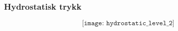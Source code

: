 \documentclass[aspectratio=169,xcolor=dvipsnames]{beamer}
\begin{document}
%
%
%
\begin{frame}
	\frametitle{Hydrostatisk trykk}

$$\texttt{[image: hydrostatic\_level\_2]}$$
\end{frame}
%
%
\end{document}
